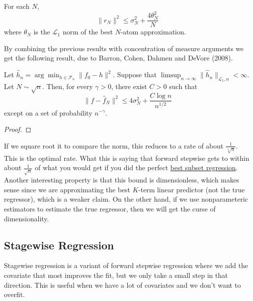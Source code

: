   \begin{corollary}
    \label{thm:rate-of-best-atom-approximation}
    For each $N$,
    \begin{equation}
      \|r_N\|^2 \leq \sigma_N^2 + \frac{4\theta_N^2}{N}
    \end{equation}
    where $\theta_N$ is the $\mathcal{L}_1$ norm of the best $N$-atom approximation.
  \end{corollary}

  By combining the previous results with concentration of measure arguments we get the following result, due to Barron, Cohen, Dahmen and DeVore (2008).

  \begin{theorem}
    \label{thm:consistency-of-sieved-least-squares}
    Let $\hat{h}_n = \arg\min_{h \in \mathcal{F}_n} \|f_0 - h\|^2$. Suppose that $\limsup_{n \to \infty} \|\hat{h}_n\|_{\mathcal{L}_1,n} < \infty$. Let $N \sim \sqrt{n}$. Then, for every $\gamma > 0$, there exist $C > 0$ such that
    \begin{equation}
      \|f - \hat{f}_N\|^2 \leq 4\sigma_N^2 + \frac{C \log n}{n^{1/2}}
    \end{equation}
    except on a set of probability $n^{-\gamma}$.
  \end{theorem} 
  \begin{proof}
    
  \end{proof}

  If we square root it to compare the norm, this reduces to a rate of about $\frac{1}{\sqrt[4]{n}}$. This is the optimal rate. What this is saying that forward stepwise gets to within about $\frac{1}{\sqrt{n}}$ of what you would get if you did the perfect \hyperref[def:best-subset-regression]{best subset regression}. Another interesting property is that this bound is dimensionless, which makes sense since we are approximating the best $K$-term linear predictor (not the true regressor), which is a weaker claim. On the other hand, if we use nonparameteric estimators to estimate the true regressor, then we will get the curse of dimensionality. 

\subsection{Stagewise Regression} 

  Stagewise regression is a variant of forward stepwise regression where we add the covariate that most improves the fit, but we only take a small step in that direction. This is useful when we have a lot of covariates and we don't want to overfit. 

